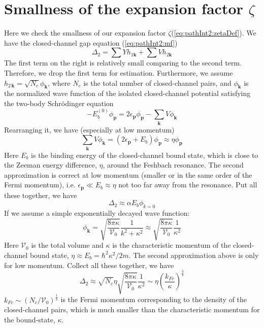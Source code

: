 \documentclass[reprint,pra]{revtex4-1}
\newcommand{\vk}{\ensuremath{\mathbf{k}}}
\newcommand{\vp}{\ensuremath{\mathbf{p}}}
\providecommand{\sch}{{Schr\"{o}dinger }}
\newcommand{\nth}[1]{\ensuremath{\frac{1}{#1}}}
\newcommand{\br}[1]{\ensuremath{\left(#1\right)}}
\begin{document}
\section{Smallness of the expansion factor $\zeta$\label{sec:pathApp:consistency}}
Here we check the smallness of our expansion factor $\zeta$(\ref{eq:pathInt2:zetaDef}).  We have the closed-channel gap equation (\ref{eq:pathInt2:mf})
\begin{equation}
\Delta_{2}=\sum{}Yh_{1\vk}+\sum{}Vh_{2\vk}\label{eq:pathInt2:mfclose}
\end{equation}
The first term on the right is relatively small comparing to the second term.  Therefore, we drop the first term for estimation.  Furthermore,  we assume $h_{2\,\vk}=\sqrt{N_{c}}\phi_{\vk}$, where $N_c$ is the total number of closed-channel pairs, and $\phi_{\vk}$ is the normalized wave function of the  isolated closed-channel potential satisfying the two-body \sch equation 
\begin{equation}\label{eq:pathInt2:phi}
-E_{b}^{(0)}\phi_{\vp}=2\epsilon_{\vp}\phi_{\vp}-\sum_{\vk}V \phi_{\vk}
\end{equation}
Rearranging it, we have (especially at low momentum)
\begin{equation*}
\sum_{\vk}V \phi_{\vk}=(2\epsilon_{\vp}+E_{b})\phi_{\vp}\approx{\eta}\phi_{\vp}
\end{equation*}
Here $E_{b}$ is the binding energy of the closed-channel bound state, which is close to the Zeeman energy difference, $\eta$, around the Feshbach resonance. The second approximation is correct at low momentum (smaller or in the same order of the Fermi momentum), i.e. $\epsilon_{\vp}\ll{}E_{b}\approx\eta$ not too far away from the resonance.  Put all these together, we have
\begin{equation*}
\Delta_{2}\approx\alpha{}E_{b}\phi_{k=0}
\end{equation*}
If we assume a simple exponentially decayed wave function:%
\begin{equation}\label{eq:pathInt2:phi2body}
\phi_{\vk}=\sqrt{\frac{8\pi\kappa}{\mathcal{V}_{0}}}\frac{1}{k^{2}+\kappa^{2}}\approx\sqrt{\frac{8\pi\kappa}{\mathcal{V}_{0}}}\frac{1}{\kappa^{2}}
\end{equation}
Here  $\mathcal{V}_{0}$ is the total volume and $\kappa$ is the characteristic momentum of the closed-channel bound state, $\eta\approx{}E_{b}=\hbar^{2}\kappa^{2}/2m$.  The second approximation above is only for  low momentum.  Collect all these together, we have
\begin{equation}
\Delta_{2}\approx\sqrt{N_{c}}\eta\sqrt{\frac{8\pi\kappa}{\mathcal{V}_{0}}}\frac{1}{\kappa^{2}}
\sim\eta\br{\frac{k_{Fc}}{\kappa}}^{\frac{3}{2}}
\end{equation}
$k_{Fc}\sim(N_c/\mathcal{V}_0)^{\nth{3}}$ is the Fermi momentum corresponding to the density of the closed-channel pairs, which is much smaller than the characteristic momentum for the bound-state, $\kappa$.  %
\end{document}
